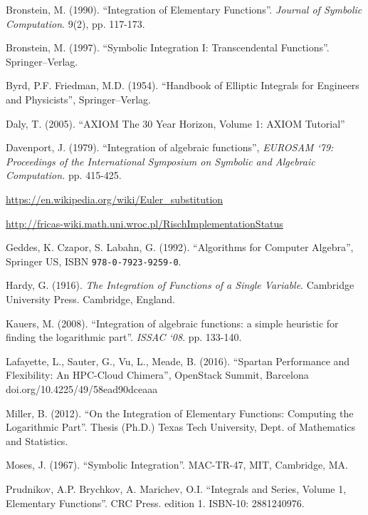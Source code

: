 \documentclass[12pt]{article}
\numberwithin{equation}{section}
\theoremstyle{definition}
\begin{document}
\begin{thebibliography}{99}

 Bronstein, M. (1990). ``Integration of Elementary Functions''. 
\textit{Journal of Symbolic Computation}. 9(2), pp. 117-173.

 Bronstein, M. (1997). ``Symbolic Integration I: Transcendental Functions''. Springer--Verlag.

 Byrd, P.F. Friedman, M.D. (1954). ``Handbook of Elliptic Integrals for Engineers and Physicists'', 
Springer--Verlag.

 Daly, T. (2005). ``AXIOM The 30 Year Horizon, Volume 1: AXIOM Tutorial'' 

 Davenport, J. (1979). ``Integration of algebraic functions'', \textit{EUROSAM `79: Proceedings of the International Symposium on Symbolic and Algebraic Computation. }pp. 415-425.

 \url{https://en.wikipedia.org/wiki/Euler_substitution}

 \url{http://fricas-wiki.math.uni.wroc.pl/RischImplementationStatus}

 Geddes, K. Czapor, S. Labahn, G. (1992). ``Algorithms for Computer Algebra'', Springer US, 
ISBN \verb~978-0-7923-9259-0~.

 Hardy, G. (1916). \textit{The Integration of Functions of a Single Variable}. Cambridge 
University Press. Cambridge, England.

 Kauers, M. (2008). ``Integration of algebraic functions: a simple heuristic for finding the logarithmic part''. \textit{ISSAC `08}. pp. 133-140.

 Lafayette, L., Sauter, G., Vu, L., Meade, B. (2016). ``Spartan Performance and Flexibility: An HPC-Cloud Chimera'', OpenStack Summit, Barcelona doi.org/10.4225/49/58ead90dceaaa

 Miller, B. (2012). ``On the Integration of Elementary Functions: Computing the Logarithmic Part''. Thesis (Ph.D.) Texas Tech University, Dept. of Mathematics and Statistics.

 Moses, J. (1967). ``Symbolic Integration''. MAC-TR-47, MIT, Cambridge, MA.

	Prudnikov, A.P. Brychkov, A. Marichev, O.I. ``Integrals and Series, Volume 1, Elementary Functions''. CRC Press. edition 1. ISBN-10: 2881240976.


\end{thebibliography}
\end{document}
